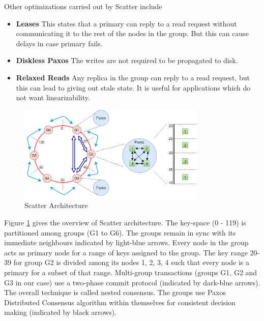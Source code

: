 \documentclass[11pt,a4paper]{article}
\begin{document}
    Other optimizations carried out by Scatter include
    
    \begin{itemize}
        \item	\textbf{Leases} This states that a primary can reply to a read request without communicating it to the rest of the nodes in the group. But this can cause delays in case primary fails. 
        \item	\textbf{Diskless Paxos} The writes are not required to be propagated to disk.
        \item	\textbf{Relaxed Reads} Any replica in the group can reply to a read request, but this can lead to giving out stale state. It is useful for applications which do not want linearizability.
        
    \end{itemize}
    
    \begin{figure}[h]
        \centering
        \includegraphics[width=0.8\textwidth]{image/scatterarch.png}
        \caption{Scatter Architecture}
        \label{scatterarchitecture}
    \end{figure}
    
    Figure \ref{scatterarchitecture} gives the overview of Scatter architecture. The key-space (0 - 119) is partitioned among groups (G1 to G6). The groups remain in sync with its immediate neighbours indicated by light-blue arrows. Every node in the group acts as primary node for a range of keys assigned to the group. The key range 20-39 for group G2 is divided among its nodes 1, 2, 3, 4 such that every node is a primary for a subset of that range. Multi-group transactions (groups G1, G2 and G3 in our case) use a two-phase commit protocol (indicated by dark-blue arrows). The overall technique is called nested consensus. The groups use Paxos Distributed Consensus algorithm \cite{PaxosLamport} within themselves for consistent decision making (indicated by black arrows).
    
\end{document}
